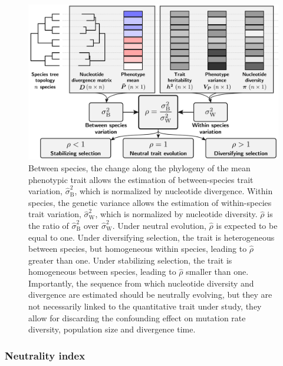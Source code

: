 \documentclass{article}
\newcommand{\EstRateBetween}{\widehat{\sigma}^2_{\mathrm{B}}}
\newcommand{\EstRateWhithin}{\widehat{\sigma}^2_{\mathrm{W}}}
\newcommand{\EstNI}{\widehat{\rho}}
\begin{document}
\begin{figure}[!ht]
    \centering
    \includegraphics[width=\textwidth, page=1] {figure1}
    \caption{
        Between species, the change along the phylogeny of the mean phenotypic trait allows the estimation of between-species trait variation, $\EstRateBetween$, which is normalized by nucleotide divergence.
        Within species, the genetic variance allows the estimation of within-species trait variation, $\EstRateWhithin$, which is  normalized by nucleotide diversity.
        $\EstNI$ is the ratio of $\EstRateBetween$ over $\EstRateWhithin$.
        Under neutral evolution, $\EstNI$ is expected to be equal to one.
        Under diversifying selection, the trait is heterogeneous between species, but homogeneous within species, leading to $\EstNI$ greater than one.
        Under stabilizing selection, the trait is homogeneous between species, leading to $\EstNI$ smaller than one.
        Importantly, the sequence from which nucleotide diversity and divergence are estimated should be neutrally evolving, but they are not necessarily linked to the quantitative trait under study, they allow for discarding the confounding effect on mutation rate diversity, population size and divergence time.
    }
    \label{fig:methods}
\end{figure}

\subsubsection*{Neutrality index}
\end{document}
